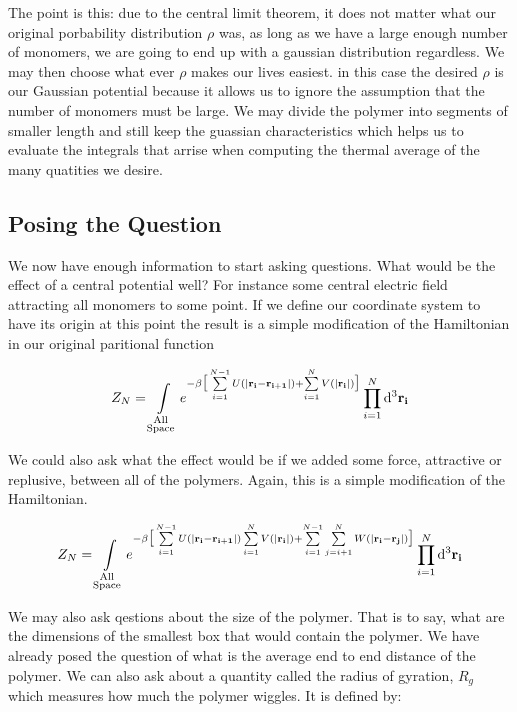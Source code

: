 \documentclass{article}
\begin{document}
The point is this: due to the central limit theorem, it does not matter what our original porbability distribution \(\rho\) was, as long as we have a large enough number of monomers, we are going to end up with a gaussian distribution regardless. We may then choose what ever  \(\rho\) makes our lives easiest. in this case the desired \(\rho\) is our Gaussian potential because it allows us to ignore the assumption that the number of monomers must be large. We may divide the polymer into segments of smaller length and still keep the guassian characteristics which helps us to evaluate the integrals that arrise when computing the thermal average of the many quatities we desire. 

\subsection{Posing the Question}
We now have enough information to start asking questions. What would be the effect of a central potential well? For instance some central electric field attracting all monomers to some point. If we define our coordinate system to have its origin at this point the result is a simple modification of the Hamiltonian in our original paritional function

\begin{equation}
Z_N=\int\limits_{\substack{\text{All} \\  \text{Space}}} \mathrm\mathrm{e}^{-\beta\big[\sum\limits_{i=1}^{N-1}U(|\mathbf{r_i-r_{i+1}}|) +\sum\limits_{i=1}^{N}V(|\mathbf{r_i}|)\big]}\prod\limits_{i=1}^N \mathrm{d}^3\mathbf{r_i}
\end{equation}

We could also ask what the effect would be if we added some force, attractive or replusive, between all of the polymers. Again, this is a simple modification of the Hamiltonian.

\begin{equation}
Z_N=\int\limits_{\substack{\text{All} \\  \text{Space}}} \mathrm\mathrm{e}^{-\beta\big[\sum\limits_{i=1}^{N-1}U(|\mathbf{r_i-r_{i+1}}|) \sum\limits_{i=1}^{N}V(|\mathbf{r_i}|)+\sum\limits_{i=1}^{N-1}\sum\limits_{j=i+1}^{N}W(|\mathbf{r_i-r_j}|)\big] }\prod\limits_{i=1}^N \mathrm{d}^3\mathbf{r_i}
\end{equation}

We may also ask qestions about the size of the polymer. That is to say, what are the dimensions of the smallest box that would contain the polymer. We have already posed the question of what is the average end to end distance of the polymer. We can also ask about a quantity called the radius of gyration, \(R_g\) which measures how much the polymer wiggles. It is defined by:
\end{document}
